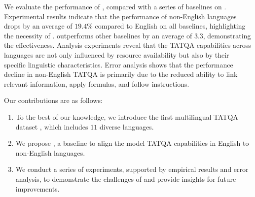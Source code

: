 We evaluate the performance of \ourmethod, compared with a series of baselines on \ourdataset. 
Experimental results indicate that the performance of non-English languages drops by an average of $19.4\%$ compared to English on all baselines, highlighting the necessity of \ourdataset. 
\ourmethod outperforms other baselines by an average of $3.3$, demonstrating the effectiveness. 
Analysis experiments reveal that the TATQA capabilities across languages are not only influenced by resource availability but also by their specific linguistic characteristics. 
Error analysis shows that the performance decline in non-English TATQA is primarily due to the reduced ability to link relevant information, apply formulas, and follow instructions.


Our contributions are as follows:
\begin{enumerate}
    \item To the best of our knowledge, we introduce the first multilingual TATQA dataset \ourdataset, which includes $11$ diverse languages.
    \item We propose \ourmethod, a baseline to align the model TATQA capabilities in English to non-English languages.
    \item We conduct a series of experiments, supported by empirical results and error analysis, to demonstrate the challenges of \ourdataset and provide insights for future improvements.
\end{enumerate}




